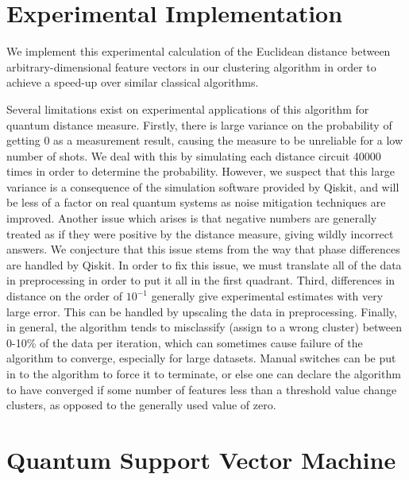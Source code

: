\documentclass[twocolumn, english]{revtex4-2}
\begin{document}
\section{Experimental Implementation}
We implement this experimental calculation of the Euclidean distance between arbitrary-dimensional feature vectors in our clustering algorithm in order to achieve a speed-up over similar classical algorithms.

Several limitations exist on experimental applications of this algorithm for quantum distance measure. Firstly, there is large variance on the probability of getting 0 as a measurement result, causing the measure to be unreliable for a low number of shots. We deal with this by simulating each distance circuit 40000 times in order to determine the probability. However, we suspect that this large variance is a consequence of the simulation software provided by Qiskit, and will be less of a factor on real quantum systems as noise mitigation techniques are improved. Another issue which arises is that negative numbers are generally treated as if they were positive by the distance measure, giving wildly incorrect answers. We conjecture that this issue stems from the way that phase differences are handled by Qiskit. In order to fix this issue, we must translate all of the data in preprocessing in order to put it all in the first quadrant. Third, differences in distance on the order of $10^{-1}$ generally give experimental estimates with very large error. This can be handled by upscaling the data in preprocessing. Finally, in general, the algorithm tends to misclassify (assign to a wrong cluster) between 0-10\% of the data per iteration, which can sometimes cause failure of the algorithm to converge, especially for large datasets. Manual switches can be put in to the algorithm to force it to terminate, or else one can declare the algorithm to have converged if some number of features less than a threshold value change clusters, as opposed to the generally used value of zero.

\section{Quantum Support Vector Machine}
\end{document}
